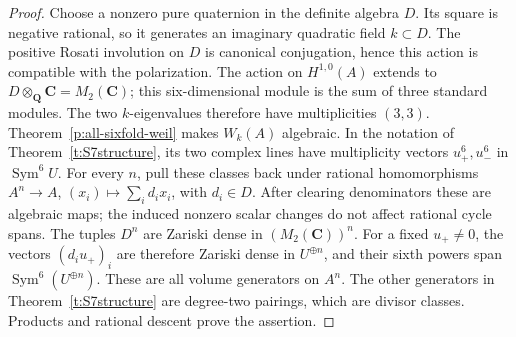 \documentclass[10pt,reqno]{article}
\theoremstyle{emphasizedplain}
\theoremstyle{emphasizeddefinition}
\theoremstyle{emphasizeddefinition}
\DeclareMathOperator{\Sym}{Sym}
\newcommand{\Q}{\mathbf Q}
\newcommand{\C}{\mathbf C}
\begin{document}
\begin{proof}
Choose a nonzero pure quaternion in the definite algebra $D$.
Its square is negative rational, so it generates an imaginary
quadratic field $k\subset D$. The positive Rosati involution on
$D$ is canonical conjugation, hence this action is compatible with
the polarization. The action on $H^{1,0}(A)$ extends to
$D\otimes_\Q\C=M_2(\C)$; this six-dimensional module is the
sum of three standard modules. The two $k$-eigenvalues therefore
have multiplicities $(3,3)$.
Theorem~\ref{p:all-sixfold-weil} makes $W_k(A)$ algebraic.
In the notation of Theorem~\ref{t:S7structure}, its two complex
lines have multiplicity vectors $u_+^6,u_-^6$ in $\Sym^6 U$.
For every $n$, pull these classes back under rational homomorphisms
$A^n\to A$, $(x_i)\mapsto\sum_i d_i x_i$, with $d_i\in D$.
After clearing denominators these are algebraic maps; the induced
nonzero scalar changes do not affect rational cycle spans.
The tuples $D^n$ are Zariski dense in $(M_2(\C))^n$.
For a fixed $u_+\ne0$, the vectors $(d_i u_+)_i$ are therefore
Zariski dense in $U^{\oplus n}$, and their sixth powers span
$\Sym^6(U^{\oplus n})$. These are all volume generators on
$A^n$. The other generators in Theorem~\ref{t:S7structure} are
degree-two pairings, which are divisor classes. Products and
rational descent prove the assertion.
\end{proof}
\end{document}
